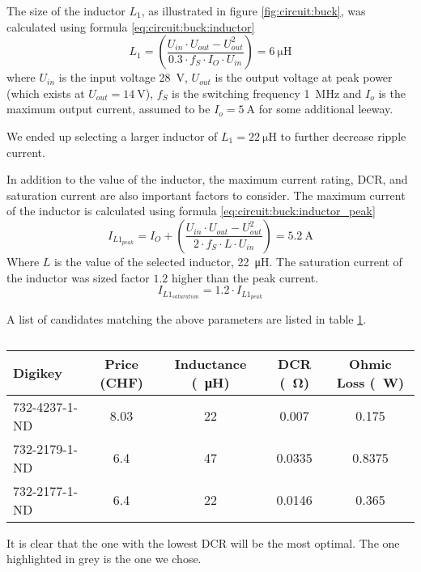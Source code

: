 The size of the inductor $L_1$, as illustrated in figure \ref{fig:circuit:buck},
was calculated using formula \ref{eq:circuit:buck:inductor}
\begin{equation}
    L_1 = \left( \frac{U_{in} \cdot U_{out} - U_{out}^2}{0.3 \cdot f_S \cdot I_O \cdot U_{in}} \right) = \SI{6}{\micro\henry}
    \label{eq:circuit:buck:inductor}
\end{equation}
where $U_{in}$ is the  input  voltage  \SI{28}{\volt},  $U_{out}$  is the output
voltage at peak power (which exists at $U_{out} = \SI{14}{\volt}$), $f_S$ is the
switching frequency \SI{1}{\mega\hertz} and $I_o$ is the maximum output current,
assumed   to   be   $I_o  =  \SI{5}{\ampere}$  for   some   additional   leeway.

We ended up selecting a  larger  inductor  of  $L_1  = \SI{22}{\micro\henry}$ to
further decrease ripple current.

In addition to the value of  the  inductor, the maximum current rating, DCR, and
saturation  current are also important factors to consider. The maximum  current
of the inductor is calculated using formula 
\ref{eq:circuit:buck:inductor_peak}
\begin{equation}
    I_{L1_{peak}} = I_O + \left( \frac{U_{in} \cdot U_{out} - U_{out}^2}{2 \cdot f_S \cdot L \cdot U_{in}} \right) = \SI{5.2}{\ampere}
    \label{eq:circuit:buck:inductor_peak}
\end{equation}
Where $L$  is  the  value  of  the selected inductor, \SI{22}{\micro\henry}. The
saturation  current  of the inductor was sized factor $1.2$ higher than the peak
current.
\begin{equation}
    I_{L1_{saturation}} = 1.2 \cdot I_{L1_{peak}}
    \label{eq:circuit:buck:inductor_saturation}
\end{equation}

A  list  of  candidates  matching  the  above  parameters  are  listed in  table
\ref{tab:circuit:buck:inductor}.

\begin{table}[th!]
    \begin{center}
        \caption{}
        \label{tab:circuit:buck:inductor}
        \begin{tabular}{lcccc}
            \toprule
            Digikey         & Price (CHF) & Inductance (\SI{}{\micro\henry}) & DCR (\SI{}{\ohm}) & Ohmic Loss (\SI{}{\watt}) \\
            \midrule
            \rowcolor{lightgray}
            732-4237-1-ND   & 8.03        & 22                               & 0.007             & 0.175  \\
            732-2179-1-ND   & 6.4         & 47                               & 0.0335            & 0.8375 \\
            732-2177-1-ND   & 6.4         & 22                               & 0.0146            & 0.365  \\
            \bottomrule
        \end{tabular}
    \end{center}
\end{table}

It  is  clear that the one with the lowest DCR will be the most optimal. The one
highlighted in grey is the one we chose.

